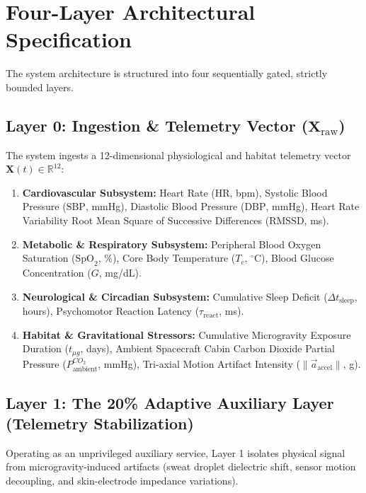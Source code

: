 \documentclass[11pt,a4paper]{article}
\begin{document}
\section{Four-Layer Architectural Specification}

The system architecture is structured into four sequentially gated, strictly bounded layers.

\subsection{Layer 0: Ingestion \& Telemetry Vector ($\mathbf{X}_{\text{raw}}$)}
The system ingests a 12-dimensional physiological and habitat telemetry vector $\mathbf{X}(t) \in \mathbb{R}^{12}$:
\begin{enumerate}
    \item \textbf{Cardiovascular Subsystem:} Heart Rate ($\text{HR}$, bpm), Systolic Blood Pressure ($\text{SBP}$, mmHg), Diastolic Blood Pressure ($\text{DBP}$, mmHg), Heart Rate Variability Root Mean Square of Successive Differences ($\text{RMSSD}$, ms).
    \item \textbf{Metabolic \& Respiratory Subsystem:} Peripheral Blood Oxygen Saturation ($\text{SpO}_2$, \%), Core Body Temperature ($T_c$, $^\circ$C), Blood Glucose Concentration ($G$, mg/dL).
    \item \textbf{Neurological \& Circadian Subsystem:} Cumulative Sleep Deficit ($\Delta t_{\text{sleep}}$, hours), Psychomotor Reaction Latency ($\tau_{\text{react}}$, ms).
    \item \textbf{Habitat \& Gravitational Stressors:} Cumulative Microgravity Exposure Duration ($t_{\mu g}$, days), Ambient Spacecraft Cabin Carbon Dioxide Partial Pressure ($P_{\text{ambient}}^{CO_2}$, mmHg), Tri-axial Motion Artifact Intensity ($\|\vec{a}_{\text{accel}}\|$, g).
\end{enumerate}

\subsection{Layer 1: The 20\% Adaptive Auxiliary Layer (Telemetry Stabilization)}
Operating as an unprivileged auxiliary service, Layer 1 isolates physical signal from microgravity-induced artifacts (sweat droplet dielectric shift, sensor motion decoupling, and skin-electrode impedance variations).
\end{document}
